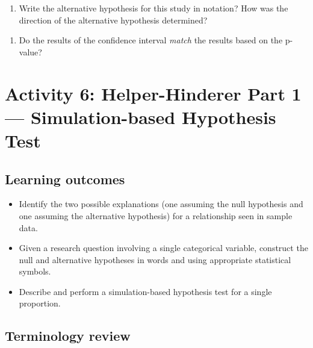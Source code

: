 \documentclass[
]{report}
\providecommand{\tightlist}{%
  \setlength{\itemsep}{0pt}\setlength{\parskip}{0pt}}
\begin{document}
\begin{enumerate}
\def\labelenumi{\arabic{enumi}.}
\setcounter{enumi}{1}
\tightlist
\item
  Write the alternative hypothesis for this study in notation? How was the direction of the alternative hypothesis determined?
\end{enumerate}

\vspace{0.4in}

\begin{enumerate}
\def\labelenumi{\arabic{enumi}.}
\setcounter{enumi}{2}
\tightlist
\item
  Do the results of the confidence interval \emph{match} the results based on the p-value?
\end{enumerate}

\vspace{0.5in}

\newpage

\section{Activity 6: Helper-Hinderer Part 1 --- Simulation-based Hypothesis Test}\label{activity-6-helper-hinderer-part-1-simulation-based-hypothesis-test}


\subsection{Learning outcomes}\label{learning-outcomes-5}

\begin{itemize}
\item
  Identify the two possible explanations (one assuming the null hypothesis and one assuming the alternative hypothesis) for a relationship seen in sample data.
\item
  Given a research question involving a single categorical variable, construct the null and alternative hypotheses
  in words and using appropriate statistical symbols.
\item
  Describe and perform a simulation-based hypothesis test for a single proportion.
\end{itemize}

\subsection{Terminology review}\label{terminology-review-5}
\end{document}
